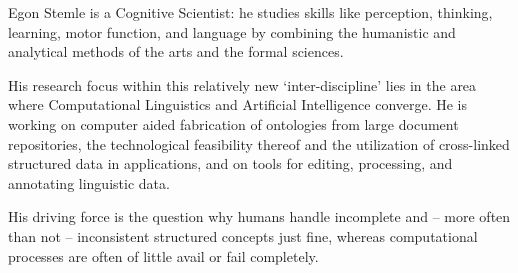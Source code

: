 Egon Stemle is a Cognitive Scientist: he studies skills like perception, thinking, learning, motor function, and language by combining the humanistic and analytical methods of the arts and the formal sciences.

His research focus within this relatively new `inter-discipline' lies in the area where Computational Linguistics and Artificial Intelligence converge. He is working on computer aided fabrication of ontologies from large document repositories, the technological feasibility thereof and the utilization of cross-linked structured data in applications, and on tools for editing, processing, and annotating linguistic data.

His driving force is the question why humans handle incomplete and -- more often than not -- inconsistent structured concepts just fine, whereas computational processes are often of little avail or fail completely. 


